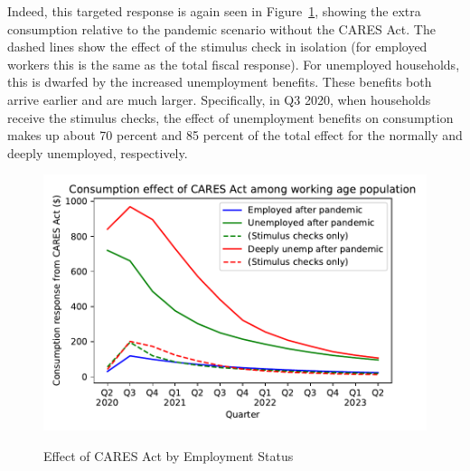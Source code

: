 \documentclass[titlepage]{\econtex}
\begin{document}
Indeed, this targeted response is again seen in Figure~\ref{stim_by_emp},
showing the extra consumption relative to the pandemic scenario without the CARES Act.
The dashed lines show the effect of the stimulus check in isolation (for employed workers this is the same as the total fiscal response).
For unemployed households, this is dwarfed by the increased unemployment benefits.
These benefits both arrive earlier and are much larger.
Specifically, in Q3 2020, when households receive the stimulus checks, the effect of unemployment benefits on consumption makes up about 70 percent and 85 percent of the total effect for the normally and deeply unemployed, respectively.

\begin{figure}
  \centering
  \caption{Effect of CARES Act by Employment Status}
  \label{stim_by_emp}
  { \includegraphics[width=8in]{./Figures/ConDeltaByEmpState}}
\end{figure}
\end{document}
